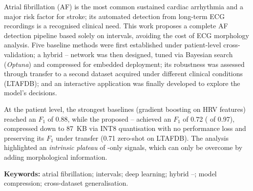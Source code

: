 Atrial fibrillation (AF) is the most common sustained cardiac arrhythmia and a major risk factor for stroke; its automated detection from long-term ECG recordings is a recognised clinical need. This work proposes a complete AF detection pipeline based solely on \RR{} intervals, avoiding the cost of ECG morphology analysis. Five baseline methods were first established under patient-level cross-validation; a hybrid \CNN--\LSTM{} network was then designed, tuned via Bayesian search (\textit{Optuna}) and compressed for embedded deployment; its robustness was assessed through transfer to a second dataset acquired under different clinical conditions (LTAFDB); and an interactive application was finally developed to explore the model's decisions.

At the patient level, the strongest baselines (gradient boosting on HRV features) reached an \(F_1\) of 0.88, while the proposed \CNN--\LSTM{} achieved an \(F_1\) of 0.72 (\AUROC{} of 0.97), compressed down to 87~KB via INT8 quantisation with no performance loss and preserving its \(F_1\) under transfer (0.71 zero-shot on LTAFDB). The analysis highlighted an \textit{intrinsic plateau} of \RR{}-only signals, which can only be overcome by adding morphological information.

\smallskip
\noindent\textbf{Keywords:} atrial fibrillation; \RR{} intervals; deep learning; hybrid \CNN--\LSTM{}; model compression; cross-dataset generalisation.
\endgroup

